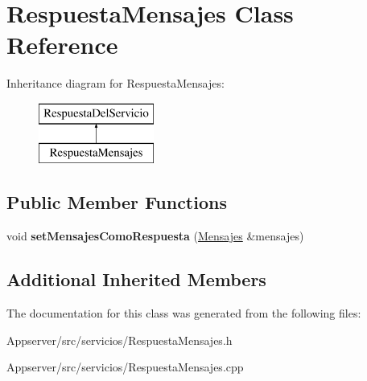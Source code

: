 \hypertarget{classRespuestaMensajes}{}\section{Respuesta\+Mensajes Class Reference}
\label{classRespuestaMensajes}
Inheritance diagram for Respuesta\+Mensajes\+:\begin{figure}[H]
\begin{center}
\leavevmode
\includegraphics[height=2.000000cm]{classRespuestaMensajes}
\end{center}
\end{figure}
\subsection*{Public Member Functions}
\begin{DoxyCompactItemize}
\item 
void {\bfseries set\+Mensajes\+Como\+Respuesta} (\hyperlink{classMensajes}{Mensajes} \&mensajes)\hypertarget{classRespuestaMensajes_a5ee62af5035eba3b4ccb9f27d64bc72f}{}\label{classRespuestaMensajes_a5ee62af5035eba3b4ccb9f27d64bc72f}

\end{DoxyCompactItemize}
\subsection*{Additional Inherited Members}


The documentation for this class was generated from the following files\+:\begin{DoxyCompactItemize}
\item 
Appserver/src/servicios/Respuesta\+Mensajes.\+h\item 
Appserver/src/servicios/Respuesta\+Mensajes.\+cpp\end{DoxyCompactItemize}
